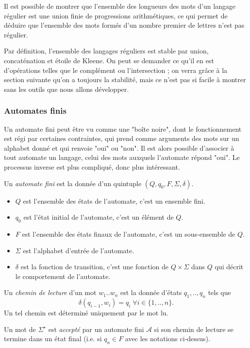 Il est possible de montrer que l'ensemble des longueurs des mots d'un langage régulier est une union finie de progressions arithmétiques, ce qui permet de déduire que l'ensemble des mots formés d'un nombre premier de lettres n'est pas régulier.

Par définition, l'ensemble des langages réguliers est stable par union, concaténation et étoile de Kleene. On peut se demander ce qu'il en est d'opérations telles que le complément ou l'intersection ; on verra grâce à la section suivante qu'on a toujours la stabilité, mais ce n'est pas si facile à montrer sans les outils que nous allons développer.



\subsubsection{Automates finis}
Un automate fini peut être vu comme une "boîte noire", dont le fonctionnement est régi par certaines contraintes, qui prend comme arguments des mots sur un alphabet donné et qui renvoie "oui" ou "non". Il est alors possible d'associer à tout automate un langage, celui des mots auxquels l'automate répond "oui". Le processus inverse est plus compliqué, donc plus intéressant.

\begin{dfn}
Un \emph{automate fini} est la donnée d'un quintuple $(Q,q_0,F,\Sigma,\delta)$.
\begin{itemize}
\item $Q$ est l'ensemble des états de l'automate, c'est un ensemble fini.
\item $q_0$ est l'état initial de l'automate, c'est un élément de $Q$.
\item $F$ est l'ensemble des états finaux de l'automate, c'est un sous-ensemble de $Q$.
\item $\Sigma$ est l'alphabet d'entrée de l'automate.
\item $\delta$ est la fonction de transition, c'est une fonction de $Q\times\Sigma$ dans $Q$ qui décrit le comportement de l'automate.
\end{itemize}

Un \emph{chemin de lecture} d'un mot $w_1..w_n$ est la donnée d'états $q_1,..,q_n$ tels que 
\[\delta(q_{i-1},w_i)=q_i\;\forall i\in \{1,..,n\}.\]
Un tel chemin est déterminé uniquement par le mot lu.

Un mot de $\Sigma^\star$ est \emph{accepté} par un automate fini $\mathcal{A}$ si son chemin de lecture se termine dans un état final (i.e. si $q_n\in F$ avec les notations ci-dessus).
\end{dfn}

